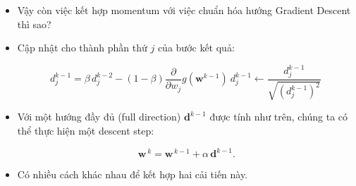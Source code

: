 \documentclass{book}
\begin{document}
\begin{itemize}
    \item Vậy còn việc kết hợp momentum với việc chuẩn hóa hướng Gradient Descent thì sao?
    \item Cập nhật cho thành phần thứ $j$ của bước kết quả:

    \begin{equation*}
        d^{k-1}_j = \beta \, d^{k-2}_j  - \left(1 - \beta\right)\frac{\partial}{\partial w_j}g\left(\mathbf{w}^{k-1}\right) \
        d^{k-1}_j \longleftarrow  \frac{d^{k-1}_j }{\sqrt{\left(d^{k-1}_j \right)^2}}\
    \end{equation*}
    \item Với một hướng đầy đủ (full direction) $\mathbf{d}^{k-1}$ được tính như trên, chúng ta có thể thực hiện một descent step:

    \begin{equation*}
        \mathbf{w}^{\,k} = \mathbf{w}^{\,k-1} + \alpha \, \mathbf{d}^{k-1}. 
    \end{equation*}    
    \item Có nhiều cách khác nhau để kết hợp hai cải tiến này.
\end{itemize}
\end{document}
